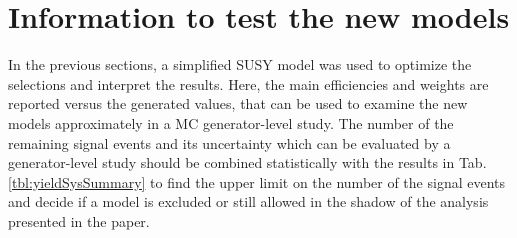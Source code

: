 \section{Information to test the new models}
\label{sect:model}
In the previous sections, a simplified SUSY model was used to optimize the selections and interpret the results. 
Here, the main efficiencies and weights are reported versus the generated values, that can be used to examine 
the new models approximately in a MC generator-level study. 
The number of the remaining signal events and its uncertainty which can be evaluated by a generator-level study 
should be combined statistically with the results in Tab. \ref{tbl:yieldSysSummary} to find the upper limit 
on the number of the signal events
and decide if a model is excluded or still allowed in the shadow of the analysis presented in the paper.

